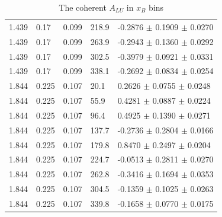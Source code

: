 \begin{table}[!h]
\begin{center}
\begin{tabular}{||l|l|l|l|l||}
  1.439 & 0.17 & 0.099 &  218.9 & -0.2876 $\pm$ 0.1909 $\pm$ 0.0270 \\                                            
  1.439 & 0.17 & 0.099 &  263.9 & -0.2943 $\pm$ 0.1360 $\pm$ 0.0292 \\                                            
  1.439 & 0.17 & 0.099 &  302.5 & -0.3979 $\pm$ 0.0921 $\pm$ 0.0331 \\                                            
  1.439 & 0.17 & 0.099 &  338.1 & -0.2692 $\pm$ 0.0834 $\pm$ 0.0254 \\                                            
   \hline                                                                                                         
  1.844 & 0.225 & 0.107 & 20.1  &  0.2626 $\pm$ 0.0755 $\pm$ 0.0248 \\                                            
  1.844 & 0.225 & 0.107 & 55.9  &  0.4281 $\pm$ 0.0887 $\pm$ 0.0224 \\                                            
  1.844 & 0.225 & 0.107 & 96.4  &  0.4925 $\pm$ 0.1390 $\pm$ 0.0271 \\                                            
  1.844 & 0.225 & 0.107 & 137.7 & -0.2736 $\pm$ 0.2804 $\pm$ 0.0166 \\                                            
  1.844 & 0.225 & 0.107 & 179.8 &  0.8470 $\pm$ 0.2497 $\pm$ 0.0204 \\                                            
  1.844 & 0.225 & 0.107 & 224.7 & -0.0513 $\pm$ 0.2811 $\pm$ 0.0270 \\                                            
  1.844 & 0.225 & 0.107 & 262.8 & -0.3416 $\pm$ 0.1694 $\pm$ 0.0353 \\                                            
  1.844 & 0.225 & 0.107 & 304.5 & -0.1359 $\pm$ 0.1025 $\pm$ 0.0263 \\                                            
  1.844 & 0.225 & 0.107 & 339.8 & -0.1658 $\pm$ 0.0770 $\pm$ 0.0175 \\                                            
         
         \hline 
         \hline
      \end{tabular}
      \caption{The coherent $A_{LU}$ in $x_B$ bins}
      \label{table:Coh_xB_BSA}
   \end{center}
\end{table}                        

